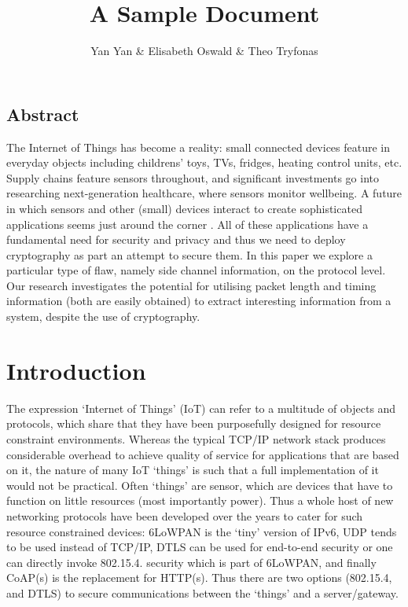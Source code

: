\documentclass{river-journal}
\begin{document}
\begin{opening}
\title{A Sample Document}
\author{Yan Yan \& Elisabeth Oswald \& Theo Tryfonas}
\end{opening}


\subsection*{Abstract}
The Internet of Things has become a reality: small connected devices feature in everyday objects
including childrens' toys, TVs, fridges, heating control units, etc. Supply chains feature sensors
throughout, and significant investments go into researching next-generation healthcare, 
where sensors monitor wellbeing. A future in which sensors and other (small) devices interact to create sophisticated applications seems just around the corner . All of these applications have a fundamental need for security and privacy and thus we need to deploy cryptography as part an attempt to secure them. In this paper we explore a particular type of flaw, namely side channel information, on the protocol level. Our research investigates the potential for utilising packet length and timing information (both are easily obtained) to extract interesting information from a system, despite the use of cryptography. 


\section{Introduction}
The expression `Internet of Things' (IoT) can refer to a multitude of objects and protocols, which share that they have been purposefully designed for resource constraint environments. Whereas the typical TCP/IP network stack produces considerable overhead to achieve quality of service for applications that are based on it, the nature of many IoT `things' is such that a full implementation of it would not be practical. Often `things' are sensor, which are devices that have to function on little resources (most importantly power). Thus a whole host of new networking protocols have been developed over the years to cater for such resource constrained devices: 6LoWPAN is the `tiny' version of IPv6, UDP tends to be used instead of TCP/IP, DTLS can be used for end-to-end security or one can directly invoke 802.15.4. security which is part of 6LoWPAN, and finally CoAP(s) is the replacement for HTTP(s). Thus there are two options (802.15.4, and DTLS) to secure communications between the `things' and a server/gateway. 
\end{document}
